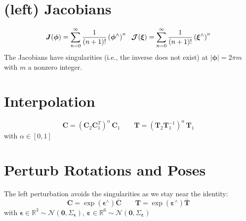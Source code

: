 \documentclass[12pt,landscape,a4paper]{article}
\newcommand{\R}{\mathbb{R}}
\newcommand{\vzero}{\bm{0}}
\newcommand{\C}{\bm{C}}
\newcommand{\T}{\bm{T}}
\newcommand{\aT}{\bm{\mathcal{T}}}
\newcommand{\J}{\bm{J}}
\newcommand{\Jc}{\bm{\mathcal{J}}}
\newcommand{\bepsilon}{\bm{\epsilon}}
\newcommand{\bvarepsilon}{\bm{\varepsilon}}
\newcommand{\bphi}{\bm{\phi}}
\newcommand{\bxi}{\bm{\xi}}
\DeclareMathOperator{\Ad}{Ad}
\begin{document}
\begin{multicols*}{3}
	\section{(left) Jacobians}
$$\begin{aligned}
	\J(\bphi) = \sum_{n=0}^\infty \frac{1}{(n+1)!} \left(\bphi^\wedge\right)^n \hskip.6em 
	\Jc(\bxi)= \sum_{n=0}^\infty \frac{1}{(n+1)!} \left(\bxi^\wedge\right)^n 
\end{aligned}$$
	The Jacobians have singularities (i.e., the inverse does not exist) at $|\bphi|=2\pi m$ with $m$ a nonzero integer.

\section{Interpolation}
	$$\C = (\C_2\C_1^T)^\alpha\,\C_1 \qquad \T = (\T_2\T_1^{-1})^\alpha\,\T_1$$
	with $\alpha\in[0,1]$

\section{Perturb Rotations and Poses}
	The left perturbation avoids the singularities as we stay near the identity:
	$$\C = \exp(\bepsilon^\wedge)\bar{\C} \qquad \T = \exp(\bvarepsilon^\wedge)\bar{\T}$$
	with $\bepsilon\in\R^3\sim \mathcal{N}(\vzero,\Sigma_{\bepsilon})$, $\bvarepsilon\in\R^6\sim \mathcal{N}(\vzero,\Sigma_{\bvarepsilon})$

\end{multicols*}
\end{document}
